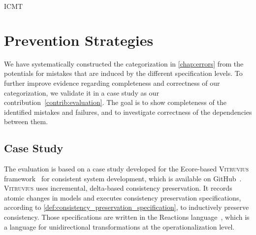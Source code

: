 \begin{copiedFrom}{ICMT}

\section{Prevention Strategies}

We have systematically constructed the categorization in \autoref{chap:errors} from the potentials for mistakes that are induced by the different specification levels. %
To further improve evidence regarding completeness and correctness of %
our categorization, we validate it in a case study as our contribution~\ref{contrib:evaluation}.
The goal is 
 to show completeness of the identified mistakes and failures, and
 to investigate correctness of the dependencies between them. %


\subsection{Case Study}
The evaluation is based on a case study developed for the Ecore-based \textsc{Vitruvius} framework~\cite{kramer2013b} for consistent system development, which is available on GitHub~\cite{vitruvFrameworkGithub}.
\textsc{Vitruvius} uses incremental, delta-based consistency preservation. 
It records atomic changes in models and executes consistency preservation specifications, according to \autoref{def:consistency_preservation_specification}, to inductively preserve consistency.
Those specifications are written in the Reactions language~\cite{klare2016b}, which is a language for unidirectional transformations at the operationalization level.


\end{copiedFrom}
